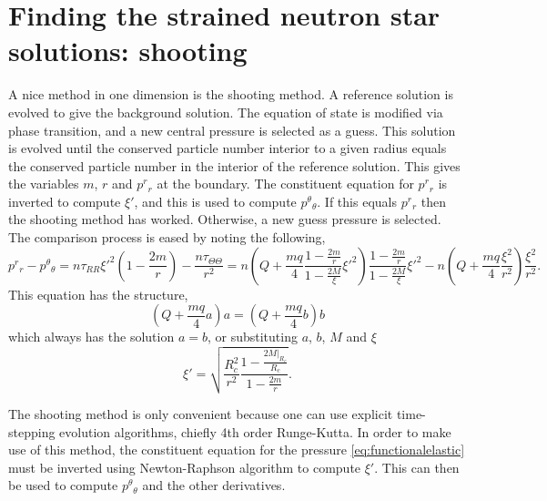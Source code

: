 \section{Finding the strained neutron star solutions: shooting}

A nice method in one dimension is the shooting method. A reference solution is evolved to give the background solution. The equation of state is modified via phase transition, and a new central pressure is selected as a guess. This solution is evolved until the conserved particle number interior to a given radius equals the conserved particle number in the interior of the reference solution. This gives the variables $m$, $r$ and $p^r{}_r$ at the boundary. The constituent equation for $p^r{}_r$ is inverted to compute $\xi'$, and this is used to compute $p^\theta{}_\theta$. If this equals $p^r{}_r$ then the shooting method has worked. Otherwise, a new guess pressure is selected. The comparison process is eased by noting the following,
\begin{equation}
p^r{}_r - p^\theta{}_\theta = n\tau_{RR}\xi'^2\left(1 - \frac{2m}{r}\right) - \frac{n\tau_{\Theta\Theta}}{r^2} = n\left(Q +
\frac{mq}{4}\frac{1-\frac{2m}{r}}{1-\frac{2M}{\xi}}\xi'^2\right)\frac{1-\frac{2m}{r}}{1-\frac{2M}{\xi}}\xi'^2 - n\left(Q +
\frac{mq}{4}\frac{\xi^2}{r^2}\right)\frac{\xi^2}{r^2}.
\end{equation}
This equation has the structure,
\begin{equation}
\left(Q + \frac{mq}{4}a\right)a = \left(Q + \frac{mq}{4}b\right)b
\end{equation}
which always has the solution $a=b$, or substituting $a$, $b$, $M$ and $\xi$
\begin{equation}
\xi' = \sqrt{
  \frac{R_c^2}{r^2}\frac{1-\frac{2M|_{R_c}}{R_c}}{1-\frac{2m}{r}}
}.
\end{equation}

The shooting method is only convenient because one can use explicit time-stepping evolution algorithms, chiefly 4th order Runge-Kutta. In order to make use of this method, the constituent equation for the pressure \eqref{eq:functionalelastic} must be inverted using Newton-Raphson algorithm to compute $\xi'$. This can then be used to compute $p^\theta{}_\theta$ and the other derivatives.